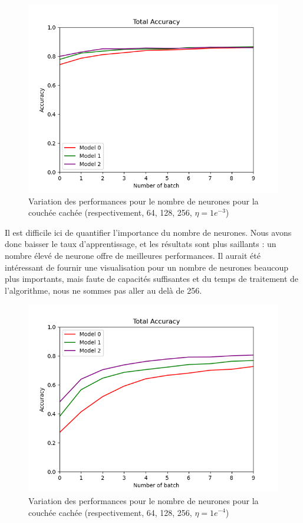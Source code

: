 \documentclass[a4paper]{article}
\begin{document}
		\begin{figure}[!h]
			\centering
			\includegraphics[width=.8\textwidth]{Fig_acc_p2_size.png}\hfill
			\caption{Variation des performances pour le nombre de neurones pour la couchée cachée (respectivement, 64, 128, 256, $\eta = 1e^{-3}$)}	
		\end{figure}
		
	Il est difficile ici de quantifier l'importance du nombre de neurones. Nous avons donc baisser le taux d'apprentissage, et les résultats sont plus saillants : un nombre élevé de neurone offre de meilleures performances. Il aurait été intéressant de fournir une visualisation pour un nombre de neurones beaucoup plus importants, mais faute de capacités suffisantes et du temps de traitement de l'algorithme, nous ne sommes pas aller au delà de 256.
	
		\begin{figure}[!h]
			\centering
			\includegraphics[width=.8\textwidth]{Fig_acc_p2_size_etavar.png}\hfill
			\caption{Variation des performances pour le nombre de neurones pour la couchée cachée (respectivement, 64, 128, 256, $\eta = 1e^{-4}$)}	
		\end{figure}
	\newpage
		
\end{document}
